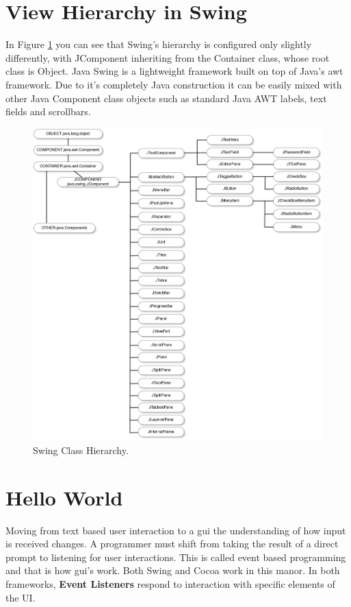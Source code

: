 \documentclass[a4paper,14pt]{article}
\begin{document}
\section{View Hierarchy in Swing} %
\label{sec:view_hierarchy_in_swing}
In Figure \ref{fig:swingHierarchy} you can see that Swing's hierarchy is configured only slightly differently, with JComponent inheriting from the Container class, whose root class is Object. Java Swing is a lightweight framework built on top of Java's awt framework. Due to it's completely Java construction it can be easily mixed with other Java Component class objects such as standard Java AWT labels, text fields and scrollbars.


\begin{figure}[H]
\centering
\includegraphics[scale=0.8]{Java1.png}
\caption{Swing Class Hierarchy. \protect{}}
\label{fig:swingHierarchy}
\end{figure}

%
%
%

\section{Hello World} %
\label{sec:hello_world}
Moving from text based user interaction to a \gls{gui} the understanding of how input is received changes. A programmer must shift from taking the result of a direct prompt to listening for user interactions. This is called event based programming and that is how \gls{gui}'s work. Both Swing and Cocoa work in this manor. In both frameworks, \textbf{Event Listeners} respond to interaction with specific elements of the UI.
\end{document}
